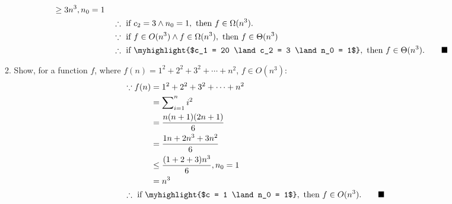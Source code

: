 \documentclass[12pt, a4paper]{article}
\newcommand{\myqed}{\tag*{$\blacksquare$}}
\begin{document}
\begin{enumerate}
\begin{enumerate}
\begin{align*}
\begin{aligned}[t]
					& \geq 3n^3, n_0 = 1
				\end{aligned} \\
				& \therefore \textrm{ if } c_2 = 3 \land n_0 = 1, \textrm{ then } f \in \Omega(n^3). \\
				& \because \textrm{ if } f \in O(n^3) \land f \in \Omega(n^3) , \textrm{ then } f \in \Theta(n^3)\\
				& \therefore \textrm{ if } \myhighlight{$c_1 = 20 \land c_2 = 3 \land n_0 = 1$}, \textrm{ then } f \in \Theta(n^3).
				\myqed
			\end{align*} \label{2(c)}
			\item Show, for a function $f$, where $f(n) = 1^2 + 2^2 + 3^2 + \cdots + n^2$, $f \in O(n^3)$:
			\begin{align*}
				& \because f(n)
				\begin{aligned}[t]
					& = 1^2 + 2^2 + 3^2 + \cdots + n^2 \\
					& = \sum\nolimits_{i=1}^{n} i^2 \\
					& = \frac{n(n + 1)(2n + 1)}{6} \\
					& = \frac{1n + 2n^3 + 3n^2}{6} \\
					& \leq \frac{(1 + 2 + 3) n^3}{6}, n_0 = 1 \\
					& = n^3
				\end{aligned} \\
				& \therefore \textrm{ if } \myhighlight{$c = 1 \land n_0 = 1$}, \textrm{ then } f \in O(n^3).
				\myqed
			\end{align*} \label{2(d)}
		\end{enumerate}
		

\end{enumerate}
\end{document}
